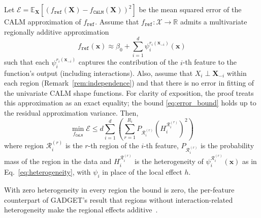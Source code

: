 \begin{proposition}
    Let $\mathcal{E} = \mathbb{E}_{\mathbf{X}}\left[\left(f_{\texttt{ref}}(\mathbf{X}) - f_{\texttt{CALM}}(\mathbf{X})\right)^2\right]$ be the mean squared error of the CALM approximation of $f_{\texttt{ref}}$. Assume that $f_{\texttt{ref}}: \mathcal{X} \to \mathbb{R}$ admits a multivariate regionally additive approximation
\begin{equation*}
f_{\texttt{ref}}(\mathbf{x}) \approx \beta_0 + \sum_{i = 1}^d\psi_i^{r_i(\mathbf{x}_{-i})}(\mathbf{x})
\end{equation*}
such that each $\psi_i^{r_i(\mathbf{x}_{-i})}$ captures the contribution of the $i$-th feature to the function's output (including interactions). Also, assume that $X_i \perp \mathbf{X}_{-i}$ within each region (Remark~\ref{rem:independence}) and that there is no error in fitting of the univariate CALM shape functions. For clarity of exposition, the proof treats this approximation as an exact equality; the bound \eqref{eq:error_bound} holds up to the residual approximation variance. Then,
\begin{equation}
\min_{f_{\texttt{CALM}}} \mathcal{E} \leq d\sum_{i=1}^{d}\left(\sum_{r=1}^{R_i}P_{\mathcal{R}_i^{(r)}}\left(H^{\mathcal{R}_i^{(r)}}_i\right)^2\right)
\label{eq:error_bound}
\end{equation}
where region $\mathcal{R}_i^{(r)}$ is the $r$-th region of the $i$-th feature, $P_{\mathcal{R}_i^{(r)}}$ is the probability mass of the region in the data and $H^{\mathcal{R}_i^{(r)}}_i$ is the heterogeneity of $\psi_i^{\mathcal{R}_i^{(r)}}(\mathbf{x})$ as in Eq.~\eqref{eq:heterogeneity}, with $\psi_i$ in place of the local effect $h$.
\label{prop:step2}
\end{proposition}
With zero heterogeneity in every region the bound is zero, the per-feature counterpart of GADGET's result that regions without interaction-related heterogeneity make the regional effects additive~\cite[Thm.~3 and Eq.~8]{herbinger2024GADGET}.

